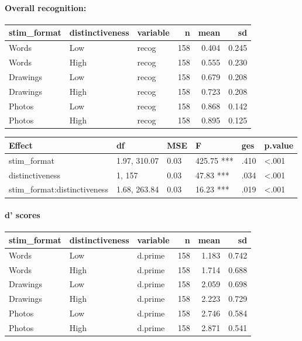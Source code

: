 \documentclass[
  11pt,
]{article}
\begin{document}
\newpage

\hypertarget{overall-recognition}{%
\paragraph{Overall recognition:}\label{overall-recognition}}

\begin{table}[!h]
\centering
\begin{tabular}{lllrrr}
\toprule
stim\_format & distinctiveness & variable & n & mean & sd\\
\midrule
Words & Low & recog & 158 & 0.404 & 0.245\\
Words & High & recog & 158 & 0.555 & 0.230\\
Drawings & Low & recog & 158 & 0.679 & 0.208\\
Drawings & High & recog & 158 & 0.723 & 0.208\\
Photos & Low & recog & 158 & 0.868 & 0.142\\
\addlinespace
Photos & High & recog & 158 & 0.895 & 0.125\\
\bottomrule
\end{tabular}
\end{table}

\begin{tabular}{l|l|l|l|l|l}
\hline
Effect & df & MSE & F & ges & p.value\\
\hline
stim\_format & 1.97, 310.07 & 0.03 & 425.75 *** & .410 & <.001\\
\hline
distinctiveness & 1, 157 & 0.03 & 47.83 *** & .034 & <.001\\
\hline
stim\_format:distinctiveness & 1.68, 263.84 & 0.03 & 16.23 *** & .019 & <.001\\
\hline
\end{tabular}

\newpage

\hypertarget{d-scores}{%
\paragraph{d' scores}\label{d-scores}}

\begin{table}[!h]
\centering
\begin{tabular}{lllrrr}
\toprule
stim\_format & distinctiveness & variable & n & mean & sd\\
\midrule
Words & Low & d.prime & 158 & 1.183 & 0.742\\
Words & High & d.prime & 158 & 1.714 & 0.688\\
Drawings & Low & d.prime & 158 & 2.059 & 0.698\\
Drawings & High & d.prime & 158 & 2.223 & 0.729\\
Photos & Low & d.prime & 158 & 2.746 & 0.584\\
\addlinespace
Photos & High & d.prime & 158 & 2.871 & 0.541\\
\bottomrule
\end{tabular}
\end{table}
\end{document}
